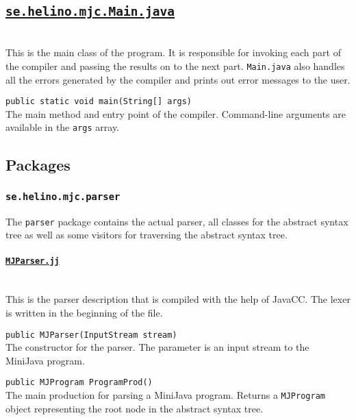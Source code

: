 \documentclass[11pt,oneside,a4paper]{article}
\newcommand{\code}[1]{\texttt{#1}}
\newcommand{\file}[1]{\texttt{#1}}
\newcommand{\class}[1]{\underline{\texttt{#1}}}
\begin{document}
\subsection{\class{se.helino.mjc.Main.java}} \hfill \\
This is the main class of the program. It is responsible for invoking each part
of the compiler and passing the results on to the next part. \file{Main.java} 
also handles all the errors generated by the compiler and prints out error
messages to the user.
\begin{description}
    \item{\code{public static void main(String[] args)}} \hfill \\
        The main method and entry point of the compiler. Command-line arguments
        are available in the \code{args} array.
\end{description}

\subsection{Packages}

\subsubsection{\code{se.helino.mjc.parser}}
The \code{parser} package contains the actual parser, all classes for the 
abstract syntax tree as well as some visitors for traversing the abstract 
syntax tree.

\paragraph{\class{MJParser.jj}} \hfill \\
This is the parser description that is compiled with the help of JavaCC. The
lexer is written in the beginning of the file.
\begin{description}
    \item{\code{public MJParser(InputStream stream)}} \hfill \\
        The constructor for the parser. The parameter is an input stream to the
        MiniJava program.

    \item{\code{public MJProgram ProgramProd()}} \hfill \\
        The main production for parsing a MiniJava program. Returns a
        \code{MJProgram}
        object representing the root node in the abstract syntax tree.
\end{description}
\end{document}
